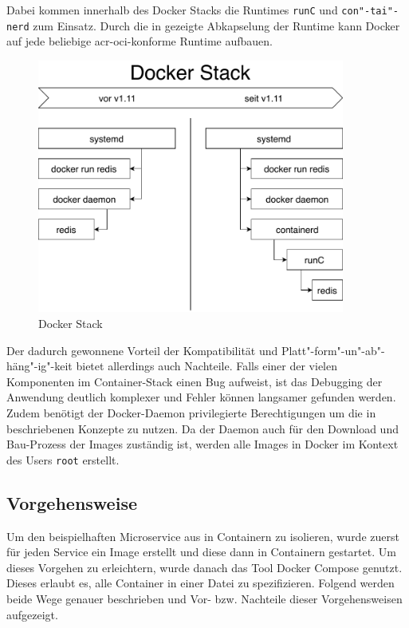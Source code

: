 Dabei kommen innerhalb des Docker Stacks die Runtimes \texttt{runC} und \texttt{con"-tai"-nerd} zum Einsatz. Durch die in  gezeigte Abkapselung der Runtime kann Docker auf jede beliebige \gls{acr-oci}-konforme Runtime aufbauen.

\begin{figure}[h]
	\begin{center}
		\includegraphics[width=0.9\textwidth]{bilder/docker-stack-containerd-runC.pdf}
		\caption{Docker Stack \citep{RktVsOtherProjects}}
		\label{fig:dockerStack}		
	\end{center}
\end{figure}

Der dadurch gewonnene Vorteil der Kompatibilität und Platt"-form"-un"-ab"-häng"-ig"-keit bietet allerdings auch Nachteile. Falls einer der vielen Komponenten im Container-Stack einen Bug aufweist, ist das Debugging der Anwendung deutlich komplexer und Fehler können langsamer gefunden werden. Zudem benötigt der Docker-Daemon privilegierte Berechtigungen um die in  beschriebenen Konzepte zu nutzen. Da der Daemon auch für den Download und Bau-Prozess der Images zuständig ist, werden alle Images in Docker im Kontext des Users \texttt{root} erstellt.

\subsection{Vorgehensweise}
\label{sec:compDockerVorgehen}

Um den beispielhaften Microservice aus  in Containern zu isolieren, wurde zuerst für jeden Service ein Image erstellt und diese dann in Containern gestartet. Um dieses Vorgehen zu erleichtern, wurde danach das Tool Docker Compose genutzt. Dieses erlaubt es, alle Container in einer Datei zu spezifizieren. Folgend werden beide Wege genauer beschrieben und Vor- bzw. Nachteile dieser Vorgehensweisen aufgezeigt.

